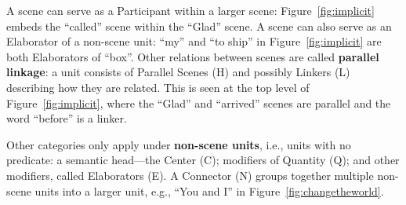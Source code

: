 \documentclass[12pt,a4paper,table]{report}
\begin{document}
A scene can serve as a Participant within a larger scene: Figure~\ref{fig:implicit} embeds the ``called'' scene within the ``Glad'' scene.
A scene can also serve as an Elaborator of a non-scene unit:
``my'' and ``to ship'' in Figure~\ref{fig:implicit} are both Elaborators of ``box''.
Other relations between scenes are called \textbf{parallel linkage}: a unit consists of Parallel Scenes (H) and possibly Linkers (L) describing how they are related. This is seen at the top level of Figure~\ref{fig:implicit}, where the ``Glad'' and ``arrived'' scenes are parallel and the word ``before'' is a linker.

Other categories only apply under \textbf{non-scene units}, i.e., units with no predicate: a semantic head---the Center (C); modifiers of Quantity (Q); and other modifiers, called Elaborators (E).
A Connector (N) groups together multiple non-scene units into a larger unit, e.g., ``You and I'' in Figure~\ref{fig:changetheworld}.
\end{document}
